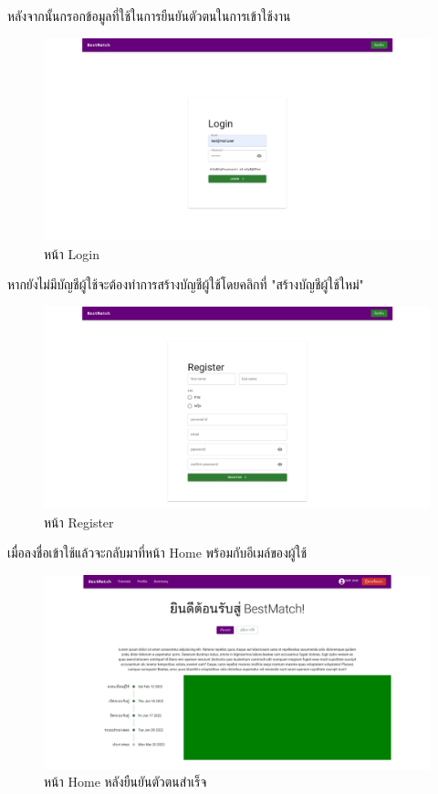 หลังจากนั้นกรอกข้อมูลที่ใช้ในการยืนยันตัวตนในการเข้าใช้งาน
\begin{figure}[!ht]
  \begin{center}
    \includegraphics[width=\linewidth]{photo/web/student/login.jpeg}
  \end{center}
  \caption{หน้า Login}
\end{figure}
%
\newline
หากยังไม่มีบัญชีผู้ใช้จะต้องทำการสร้างบัญชีผู้ใช้โดยคลิกที่ "สร้างบัญชีผู้ใช้ใหม่"
\begin{figure}[!ht]
  \begin{center}
    \includegraphics[width=\linewidth]{photo/web/student/register.jpeg}
  \end{center}
  \caption{หน้า Register}
\end{figure}
\newpage
%
เมื่อลงชื่อเข้าใช้แล้วจะกลับมาที่หน้า Home พร้อมกับอีเมล์ของผู้ใช้
\begin{figure}[!ht]
  \begin{center}
    \includegraphics[width=\linewidth]{photo/web/student/home-auth.jpeg}
  \end{center}
  \caption{หน้า Home หลังยืนยันตัวตนสำเร็จ}
\end{figure}
